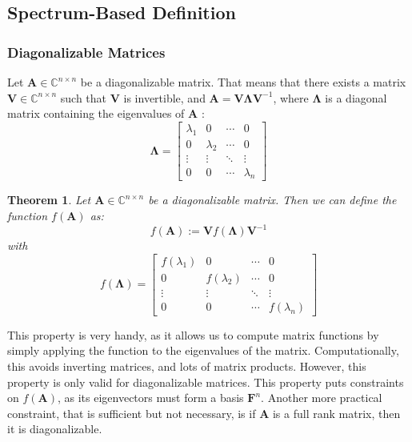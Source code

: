 \documentclass[11pt]{article}
\newtheorem{theorem}{Theorem}[section]
\numberwithin{equation}{section}
\begin{document}
\subsection{Spectrum-Based Definition}
\subsubsection*{Diagonalizable Matrices}
Let $\mathbf{A}\in\mathbb{C}^{n\times n}$ be a diagonalizable matrix. That means that there exists a matrix $\mathbf{V}\in\mathbb{C}^{n\times n}$ such that $\mathbf{V}$ is invertible, and $\mathbf{A} = \mathbf{V}\mathbf{\Lambda}\mathbf{V}^{-1}$, where $\mathbf{\Lambda}$ is a diagonal matrix containing the eigenvalues of $\mathbf{A}$ :
\begin{equation}
    \mathbf{\Lambda} = \begin{bmatrix}
        \lambda_1 & 0 & \cdots & 0 \\
        0 & \lambda_2 & \cdots & 0 \\
        \vdots & \vdots & \ddots & \vdots \\
        0 & 0 & \cdots & \lambda_n
    \end{bmatrix}
\end{equation}
\begin{theorem}
    Let $\mathbf{A}\in\mathbb{C}^{n\times n}$ be a diagonalizable matrix. Then we can define the function $f(\mathbf{A})$ as:
    \begin{equation}
        f(\mathbf{A}) := \mathbf{V}f(\mathbf{\Lambda})\mathbf{V}^{-1}
    \end{equation}
    with 
    \begin{equation}
        f(\mathbf{\Lambda}) = \begin{bmatrix}
            f(\lambda_1) & 0 & \cdots & 0 \\
            0 & f(\lambda_2) & \cdots & 0 \\
            \vdots & \vdots & \ddots & \vdots \\
            0 & 0 & \cdots & f(\lambda_n)
        \end{bmatrix}
    \end{equation}        
\end{theorem}
This property is very handy, as it allows us to compute matrix functions by simply applying the function to the eigenvalues of the matrix. Computationally, this avoids inverting matrices, and lots of matrix products. However, this property is only valid for diagonalizable matrices. This property puts constraints on $f(\mathbf{A})$, as its eigenvectors must form a basis $\mathbf{F}^n$. Another more practical constraint, that is sufficient but not necessary, is if $\mathbf{A}$ is a full rank matrix, then it is diagonalizable.
\end{document}
